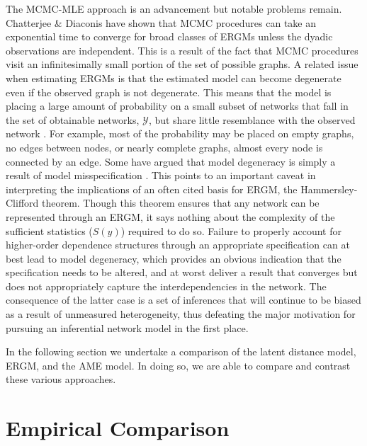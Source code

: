 \documentclass[9pt,twocolumn,twoside,lineno]{pnas-new}
\begin{document}
The MCMC-MLE approach is an advancement but notable problems remain. Chatterjee \& Diaconis \citep{chatterjee:diaconis:2013} have shown that MCMC procedures can take an exponential time to converge for broad classes of ERGMs unless the dyadic observations are independent. This is a result of the fact that MCMC procedures visit an infinitesimally small portion of the set of possible graphs. A related issue when estimating ERGMs is that the estimated model can become degenerate even if the observed graph is not degenerate. This means that the model is placing a large amount of probability on a small subset of networks that fall in the set of obtainable networks, $\mathcal{Y}$, but share little resemblance with the observed network \citep{schweinberger:2011}. For example, most of the probability may be placed on empty graphs, no edges between nodes, or nearly complete graphs, almost every node is connected by an edge. Some have argued that model degeneracy is simply a result of model misspecification \citep{goodreau:etal:2008,handcock:etal:2008}. This points to an important caveat in interpreting the implications of an often cited basis for ERGM, the Hammersley-Clifford theorem. Though this theorem ensures that any network can be represented through an ERGM, it says nothing about the complexity of the sufficient statistics ($S(y)$) required to do so. Failure to properly account for higher-order dependence structures through an appropriate specification can at best lead to model degeneracy, which provides an obvious indication that the specification needs to be altered, and at worst deliver a result that converges but does not appropriately capture the interdependencies in the network. The consequence of the latter case is a set of inferences that will continue to be biased as a result of unmeasured heterogeneity, thus defeating the major motivation for pursuing an inferential network model in the first place.

In the following section we undertake a comparison of the latent distance model, ERGM, and the AME model. In doing so, we are able to compare and contrast these various approaches.

\section*{\textbf{Empirical Comparison}}
\end{document}
